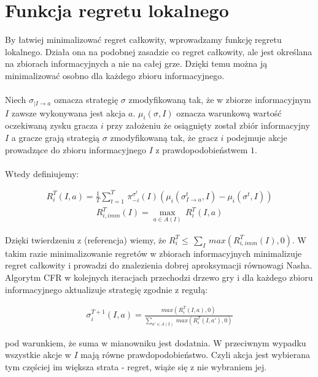 \documentclass[licencjacka]{pracamgr}
\begin{document}
\section{Funkcja regretu lokalnego}

By łatwiej minimalizować regret całkowity, wprowadzamy funkcję regretu lokalnego.
Działa ona na podobnej zasadzie co regret całkowity, ale jest określana na zbiorach informacyjnych
a nie na całej grze. Dzięki temu można ją minimalizować osobno dla każdego zbioru informacyjnego. \\\\

\noindent
Niech $\sigma_{|I \rightarrow a}$ oznacza strategię $\sigma$ zmodyfikowaną tak, że w zbiorze informacyjnym $I$ zawsze
wykonywana jest akcja $a$. $\mu_i(\sigma, I)$ oznacza warunkową wartość oczekiwaną zysku gracza $i$ przy założeniu że
osiągnięty został zbiór informacyjny $I$ a gracze grają strategią $\sigma$ zmodyfikowaną tak, że gracz $i$
podejmuje akcje prowadzące do zbioru informacyjnego $I$ z prawdopodobieństwem $1$. \\\\

\noindent
Wtedy definiujemy:

\begin{align*}
R_i^T(I, a) = \frac{1}{T} \sum\limits_{t=1}^{T} \, \pi_{-i}^{\sigma^t}(I)(\mu_i(\sigma^t_{I \rightarrow a}, I) - \mu_i(\sigma^t, I))
\end{align*}
\begin{align*}
R_{i, imm}^T(I) = \max_{a \in A(I)} \, R_i^T(I, a)
\end{align*}

\noindent
Dzięki twierdzeniu z (referencja) wiemy, że $R_i^T \leq \, \sum_{I} \, max(R_{i, imm}^T(I), 0)$. W takim razie
minimalizowanie regretów w zbiorach informacyjnych minimalizuje regret całkowity i prowadzi do znalezienia
dobrej aproksymacji równowagi Nasha. \\

\noindent
Algorytm CFR w kolejnych iteracjach przechodzi drzewo gry i dla każdego zbioru informacyjnego aktualizuje strategię
zgodnie z regułą:

\begin{align*}
\sigma_i^{T+1} (I, a) = \frac{max(R_i^T(I, a), 0)}{\sum\limits_{a' \in A(I)} \, max(R_i^T(I, a'), 0)}
\end{align*}

\noindent
pod warunkiem, że suma w mianowniku jest dodatnia. W przeciwnym wypadku wszystkie akcje w $I$ mają równe prawdopodobieństwo.
Czyli akcja jest wybierana tym częściej im większa strata - regret, wiąże się z nie wybraniem jej.\\\\
\end{document}
